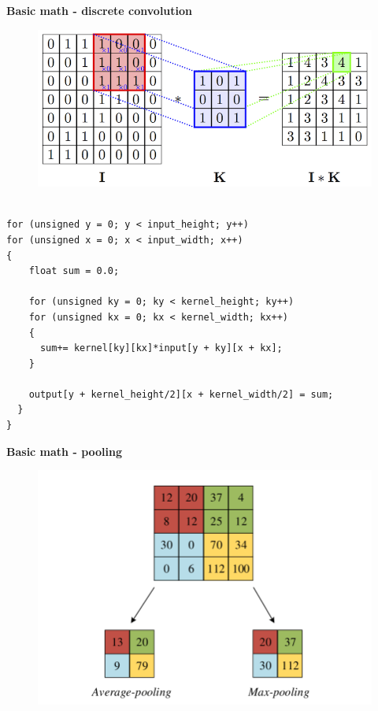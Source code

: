 \documentclass[xcolor=dvipsnames]{beamer}
\begin{document}
\begin{frame}[fragile]
{\bf Basic math - discrete convolution}

\begin{figure}
  \includegraphics[scale=0.2]{../diagrams/convolution_2d.png}
\end{figure}


\begin{lstlisting}

for (unsigned y = 0; y < input_height; y++)
for (unsigned x = 0; x < input_width; x++)
{
    float sum = 0.0;

    for (unsigned ky = 0; ky < kernel_height; ky++)
    for (unsigned kx = 0; kx < kernel_width; kx++)
    {
      sum+= kernel[ky][kx]*input[y + ky][x + kx];
    }

    output[y + kernel_height/2][x + kernel_width/2] = sum;
  }
}
\end{lstlisting}
\end{frame}


\begin{frame}{\bf Basic math - pooling}

\begin{figure}
  \includegraphics[scale=0.2]{../diagrams/pooling.png}
\end{figure}

\end{frame}
\end{document}
